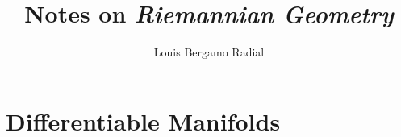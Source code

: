 \documentclass[12pt,oneside,a4paper]{book}
\title{Notes on \textit{Riemannian Geometry}}
\author{Louis Bergamo Radial}
\numberwithin{equation}{section}
\begin{document}
\maketitle

\tableofcontents

\chapter{Differentiable Manifolds}


\printbibliography
\end{document}

